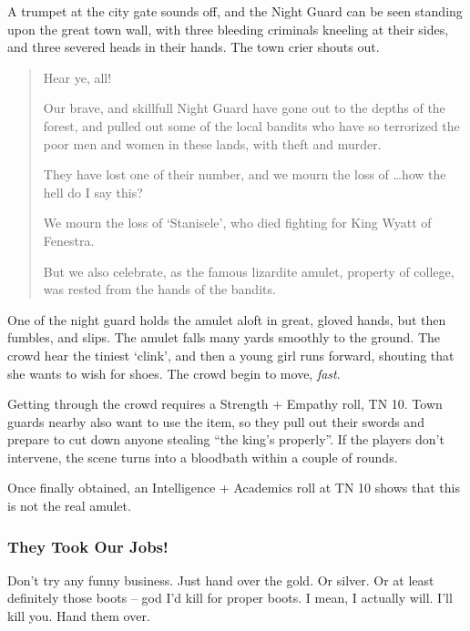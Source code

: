\begin{boxtext}
	A trumpet at the city gate sounds off, and the Night Guard can be seen standing upon the great town wall, with three bleeding criminals kneeling at their sides, and three severed heads in their hands.  The town crier shouts out.

	\begin{quotation}
		Hear ye, all!

		Our brave, and skillfull Night Guard have gone out to the depths of the forest, and pulled out some of the local bandits who have so terrorized the poor men and women in these lands, with theft and murder.

		They have lost one of their number, and we mourn the loss of \ldots how the hell do I say this?

		We mourn the loss of `Stanisele', who died fighting for King Wyatt of Fenestra.

		But we also celebrate, as the famous lizardite amulet, property of \gls{college}, was rested from the hands of the bandits.
	\end{quotation}

	One of the night guard holds the amulet aloft in great, gloved hands, but then fumbles, and slips.  The amulet falls many yards smoothly to the ground.  The crowd hear the tiniest `clink', and then a young girl runs forward, shouting that she wants to wish for shoes.  The crowd begin to move, \emph{fast}.
\end{boxtext}

Getting through the crowd requires a Strength + Empathy roll, TN 10.  Town guards nearby also want to use the item, so they pull out their swords and prepare to cut down anyone stealing ``the king's properly''.  If the players don't intervene, the scene turns into a bloodbath within a couple of rounds.

Once finally obtained, an Intelligence + Academics roll at TN 10 shows that this is not the real amulet.

\subsubsection{They Took Our Jobs!}

\begin{speechtext}
	Don't try any funny business.  Just hand over the gold. Or silver.  Or at least definitely those boots -- god I'd kill for proper boots.  I mean, I actually will.  I'll kill you.  Hand them over.
\end{speechtext}

